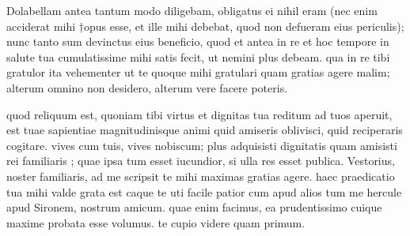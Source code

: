 


 Dolabellam antea tantum modo diligebam, obligatus ei nihil eram (nec enim acciderat mihi †opus esse, et ille mihi debebat, quod non defueram eius periculis); nunc tanto sum devinctus eius beneficio, quod et antea in re et hoc tempore in salute tua cumulatissime mihi satis fecit, ut nemini plus debeam. qua in re tibi gratulor ita vehementer ut te quoque mihi gratulari quam gratias agere malim; alterum omnino non desidero, alterum vere facere poteris.

 quod reliquum est, quoniam tibi virtus et dignitas tua reditum ad tuos aperuit, est tuae sapientiae magnitudinisque animi quid amiseris oblivisci, quid reciperaris cogitare. vives cum tuis, vives nobiscum; plus adquisisti dignitatis quam amisisti rei familiaris ; quae ipsa tum esset iucundior, si ulla res esset publica. Vestorius, noster familiaris, ad me scripsit te mihi maximas gratias agere. haec praedicatio tua mihi valde grata est caque te uti facile patior cum apud alios tum me hercule apud Sironem, nostrum amicum. quae enim facimus, ea prudentissimo cuique maxime probata esse volumus. te cupio videre quam primum.
